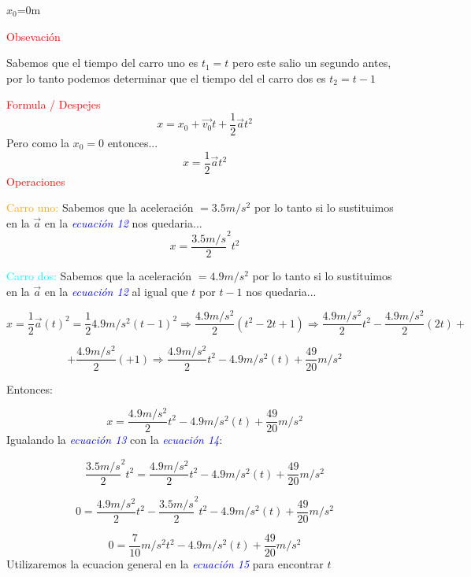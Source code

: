 \documentclass[letterpaper,12pt]{article}
\begin{document}
\begin{enumerate}
\begin {itemize}
    $x_{0}$=0m
    
    {\textcolor{red}{Obsevación}}
     
     Sabemos que el tiempo del carro uno es $t_1= t$ pero este salio un segundo antes, por lo tanto podemos determinar que  el tiempo del el carro dos es $t_2=t-1$ 
     
    {\textcolor{red}{Formula / Despejes}} 
    \begin{equation}
      {x}={x_0}+\Vec{v_0}t+\frac{1}{2}\Vec{a}t^{2}
      \end{equation}
     Pero como la $x_0=0$ entonces...
     \begin{equation}
      x=\frac{1}{2}\Vec{a}t^{2}
      \end{equation}
    {\textcolor{red}{Operaciones}} 
    
    {\textcolor{orange}{Carro uno:}} Sabemos que la aceleración $=3.5m/s^{2}$ por lo tanto si lo sustituimos en la $\Vec{a}$ en la {\textcolor{blue}{\textit{ecuación 12}}} nos quedaria...
    \begin{equation}
      x=\frac{3.5m/s}{2}^{2}t^{2}
      \end{equation}
    
     {\textcolor{cyan}{Carro dos:}} Sabemos que la aceleración $=4.9m/s^{2}$ por lo tanto si lo sustituimos en la $\Vec{a}$ en la {\textcolor{blue}{\textit{ecuación 12}}} al igual que  $t$ por $t-1$ nos quedaria...
     
      $$x=\frac{1}{2}\Vec{a}(t)^{2}=\frac{1}{2}4.9m/s^{2}(t-1)^{2} \Rightarrow \frac{4.9m/s^{2}}{2}(t^{2}-2t+1) \Rightarrow \frac{4.9m/s^{2}}{2}t^{2}-\frac{4.9m/s^{2}}{2}(2t)+$$
      
       $$+\frac{4.9m/s^{2}}{2}(+1)\Rightarrow \frac{4.9m/s^{2}}{2}t^{2}-4.9m/s^{2}(t)+\frac{49}{20}m/s^{2}$$
      
     Entonces:
      
     \begin{equation}
      x=\frac{4.9m/s^{2}}{2}t^{2}-4.9m/s^{2}(t)+\frac{49}{20}m/s^{2}
      \end{equation}
     Igualando la {\textcolor{blue}{\textit{ecuación 13}}} con la {\textcolor{blue}{\textit{ecuación 14}}}: 
     
     $$\frac{3.5m/s}{2}^{2}t^{2}=\frac{4.9m/s^{2}}{2}t^{2}-4.9m/s^{2}(t)+\frac{49}{20}m/s^{2}$$
     
      $$0=\frac{4.9m/s^{2}}{2}t^{2}-\frac{3.5m/s}{2}^{2}t^{2}-4.9m/s^{2}(t)+\frac{49}{20}m/s^{2}$$
      
     \begin{equation}
       0=\frac{7}{10}m/s^{2}t^{2}-4.9m/s^{2}(t)+\frac{49}{20}m/s^{2}
      \end{equation}
     Utilizaremos la ecuacion general en la {\textcolor{blue}{\textit{ecuación 15}}} para encontrar $t$
     

\end{itemize}
\end{enumerate}
\end{document}
